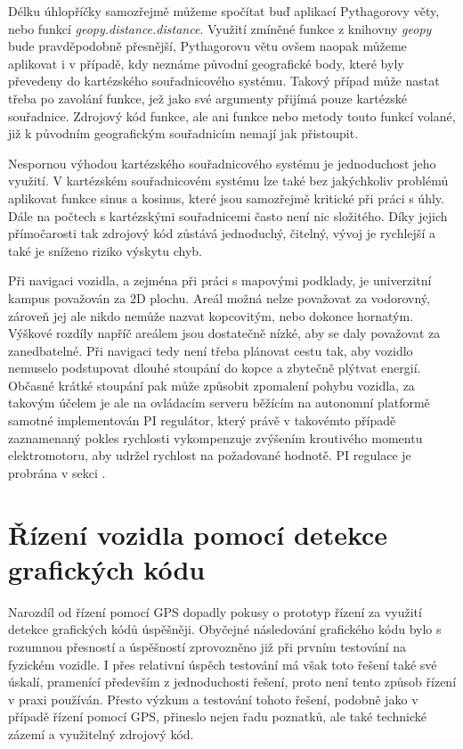 \documentclass[czech, bachelor]{diploma}
\begin{document}
Délku úhlopříčky samozřejmě můžeme spočítat buď aplikací Pythagorovy věty, nebo funkcí \emph{geopy.distance.distance}. Využití
zmíněné funkce z knihovny \emph{geopy} bude pravděpodobně přesnější, Pythagorovu větu ovšem naopak můžeme aplikovat i v případě,
kdy neznáme původní geografické body, které byly převedeny do kartézského souřadnicového systému. Takový případ může nastat třeba
po zavolání funkce, jež jako své argumenty přijímá pouze kartézské souřadnice. Zdrojový kód funkce, ale ani funkce nebo metody
touto funkcí volané, již k původním geografickým souřadnicím nemají jak přistoupit.

Nespornou výhodou kartézského souřadnicového systému je jednoduchost jeho využití. V kartézském souřadnicovém systému lze také
bez jakýchkoliv problémů aplikovat funkce sinus a kosinus, které jsou samozřejmě kritické při práci s úhly. Dále na počtech
s kartézskými souřadnicemi často není nic složitého. Díky jejich přímočarosti tak zdrojový kód zůstává jednoduchý, čitelný,
vývoj je rychlejší a také je sníženo riziko výskytu chyb.

Při navigaci vozidla, a zejména při práci s mapovými podklady, je univerzitní kampus považován za 2D plochu. Areál možná nelze
považovat za vodorovný, zároveň jej ale nikdo nemůže nazvat kopcovitým, nebo dokonce hornatým. Výškové rozdíly napříč areálem jsou
dostatečně nízké, aby se daly považovat za zanedbatelné. Při navigaci tedy není třeba plánovat cestu tak, aby vozidlo nemuselo
podstupovat dlouhé stoupání do kopce a zbytečně plýtvat energií. Občasné krátké stoupání pak může způsobit zpomalení pohybu
vozidla, za takovým účelem je ale na ovládacím serveru běžícím na autonomní platformě samotné implementován PI regulátor, který
právě v takovémto případě zaznamenaný pokles rychlosti vykompenzuje zvýšením kroutivého momentu elektromotoru, aby udržel rychlost
na požadované hodnotě. PI regulace je probrána v sekci .

\section{Řízení vozidla pomocí detekce grafických kódu}

Narozdíl od řízení pomocí GPS dopadly pokusy o prototyp řízení za využití detekce grafických kódů úspěšněji. Obyčejné následování
grafického kódu bylo s rozumnou přesností a úspěšností zprovozněno již při prvním testování na fyzickém vozidle. I přes relativní
úspěch testování má však toto řešení také své úskalí, pramenící především z jednoduchosti řešení, proto není tento způsob řízení
v praxi používán. Přesto výzkum a testování tohoto řešení, podobně jako v případě řízení pomocí GPS, přineslo nejen řadu poznatků,
ale také technické zázemí a využitelný zdrojový kód.
\end{document}
